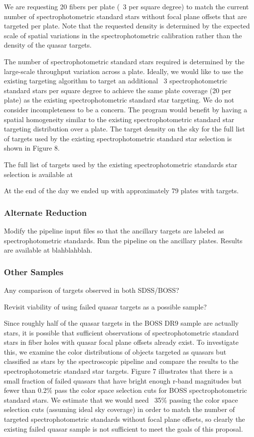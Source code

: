 \documentclass[useAMS,usenatbib]{mn2e}
\begin{document}
We are requesting 20 fibers per plate (~3 per square degree) to match the current number of spectrophotometric standard stars without focal plane offsets that are targeted per plate. Note that the requested density is determined by the expected scale of spatial variations in the spectrophotometric calibration rather than the density of the quasar targets.

The number of spectrophotometric standard stars required is determined by the large-scale throughput variation across a plate. Ideally, we would like to use the existing targeting algorithm to target an additional ~3 spectrophotometric standard stars per square degree to achieve the same plate coverage (20 per plate) as the existing spectrophotometric standard star targeting. We do not consider incompleteness to be a concern. The program would benefit by having a spatial homogeneity similar to the existing spectrophotometric standard star targeting distribution over a plate. The target density on the sky for the full list of targets used by the existing spectrophotometric standard star selection is shown in Figure 8.

The full list of targets used by the existing spectrophotometric standards star selection is available at %

At the end of the day we ended up with approximately 79 plates with targets.

\subsubsection{Alternate Reduction}

Modify the pipeline input files so that the ancillary targets are labeled as spectrophotometric standards. Run the pipeline on the ancillary plates. Results are available at blahblahblah.

\subsubsection{Other Samples}

Any comparison of targets observed in both SDSS/BOSS?

Revisit viability of using failed quasar targets as a possible sample?

Since roughly half of the quasar targets in the BOSS DR9 sample are actually stars, it is possible that sufficient observations of spectrophotometric standard stars in fiber holes with quasar focal plane offsets already exist. To investigate this, we examine the color distributions of objects targeted as quasars but classified as stars by the spectroscopic pipeline and compare the results to the spectrophotometric standard star targets. Figure 7 illustrates that there is a small fraction of failed quasars that have bright enough r-band magnitudes but fewer than 0.2\% pass the color space selection cuts for BOSS spectrophotometric standard stars. We estimate that we would need ~35\% passing the color space selection cuts (assuming ideal sky coverage) in order to match the number of targeted spectrophotometric standards without focal plane offsets, so clearly the existing failed quasar sample is not sufficient to meet the goals of this proposal.
\end{document}
